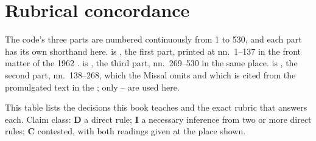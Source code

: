 \section{Rubrical concordance}

The code's three parts are numbered continuously from 1 to 530, and each part
has its own shorthand here.  is , the first
part, printed at nn.~1--137 in the front matter of the 1962 .  is , the third
part, nn.~269--530 in the same place.  is , the second part, nn.~138--268, which the Missal omits and
which is cited from the promulgated text in the ; only
-- are used here.

This table lists the decisions this book teaches and the exact rubric that
answers each. Claim class: \textbf{D} a direct rule; \textbf{I} a necessary
inference from two or more direct rules; \textbf{C} contested, with both
readings given at the place shown.

